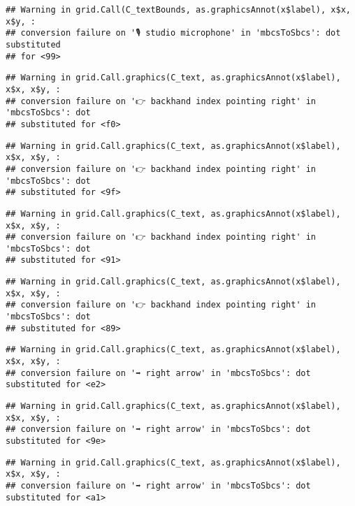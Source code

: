 \documentclass[
]{article}
\begin{document}
\begin{verbatim}
## Warning in grid.Call(C_textBounds, as.graphicsAnnot(x$label), x$x, x$y, :
## conversion failure on '🎙 studio microphone' in 'mbcsToSbcs': dot substituted
## for <99>
\end{verbatim}

\begin{verbatim}
## Warning in grid.Call.graphics(C_text, as.graphicsAnnot(x$label), x$x, x$y, :
## conversion failure on '👉 backhand index pointing right' in 'mbcsToSbcs': dot
## substituted for <f0>
\end{verbatim}

\begin{verbatim}
## Warning in grid.Call.graphics(C_text, as.graphicsAnnot(x$label), x$x, x$y, :
## conversion failure on '👉 backhand index pointing right' in 'mbcsToSbcs': dot
## substituted for <9f>
\end{verbatim}

\begin{verbatim}
## Warning in grid.Call.graphics(C_text, as.graphicsAnnot(x$label), x$x, x$y, :
## conversion failure on '👉 backhand index pointing right' in 'mbcsToSbcs': dot
## substituted for <91>
\end{verbatim}

\begin{verbatim}
## Warning in grid.Call.graphics(C_text, as.graphicsAnnot(x$label), x$x, x$y, :
## conversion failure on '👉 backhand index pointing right' in 'mbcsToSbcs': dot
## substituted for <89>
\end{verbatim}

\begin{verbatim}
## Warning in grid.Call.graphics(C_text, as.graphicsAnnot(x$label), x$x, x$y, :
## conversion failure on '➡ right arrow' in 'mbcsToSbcs': dot substituted for <e2>
\end{verbatim}

\begin{verbatim}
## Warning in grid.Call.graphics(C_text, as.graphicsAnnot(x$label), x$x, x$y, :
## conversion failure on '➡ right arrow' in 'mbcsToSbcs': dot substituted for <9e>
\end{verbatim}

\begin{verbatim}
## Warning in grid.Call.graphics(C_text, as.graphicsAnnot(x$label), x$x, x$y, :
## conversion failure on '➡ right arrow' in 'mbcsToSbcs': dot substituted for <a1>
\end{verbatim}
\end{document}
